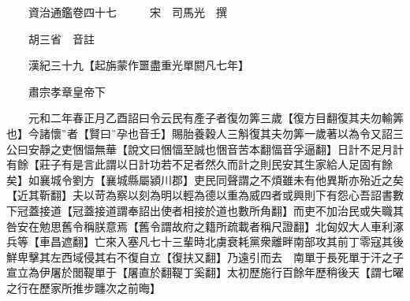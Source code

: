 










 


 
 


 

  
  
  
  
  





  
  
  
  
  
 
  

  

  
  
  



  

 
 

  
   




  

  
  


  　　資治通鑑卷四十七　　　宋　司馬光　撰

　　胡三省　音註

　　漢紀三十九【起旃蒙作噩盡重光單閼凡七年】

　　肅宗孝章皇帝下

　　元和二年春正月乙酉詔曰令云民有產子者復勿筭三歲【復方目翻復其夫勿輸筭也】今諸懷者【賢曰孕也音壬】賜胎養穀人三斛復其夫勿筭一歲著以為令又詔三公曰安靜之吏悃愊無華【說文曰悃愊至誠也悃音苦本翻愊音孚逼翻】日計不足月計有餘【莊子有是言此謂以日計功若不足者然久而計之則民安其生家給人足固有餘矣】如襄城令劉方【襄城縣屬潁川郡】吏民同聲謂之不煩雖未有他異斯亦殆近之矣【近其靳翻】夫以苛為察以刻為明以輕為德以重為威四者或興則下有怨心吾詔書數下冠蓋接道【冠蓋接道謂奉詔出使者相接於道也數所角翻】而吏不加治民或失職其咎安在勉思舊令稱朕意焉【舊令謂故府之籍所疏載者稱尺證翻】北匈奴大人車利涿兵等【車昌遮翻】亡來入塞凡七十三輩時北虜衰耗黨衆離畔南部攻其前丁零寇其後鮮卑擊其左西域侵其右不復自立【復扶又翻】乃遠引而去　南單于長死單于汗之子宣立為伊屠於閭鞮單于【屠直於翻鞮丁奚翻】太初歷施行百餘年歷稍後天【謂七曜之行在歷家所推步躔次之前晦】

